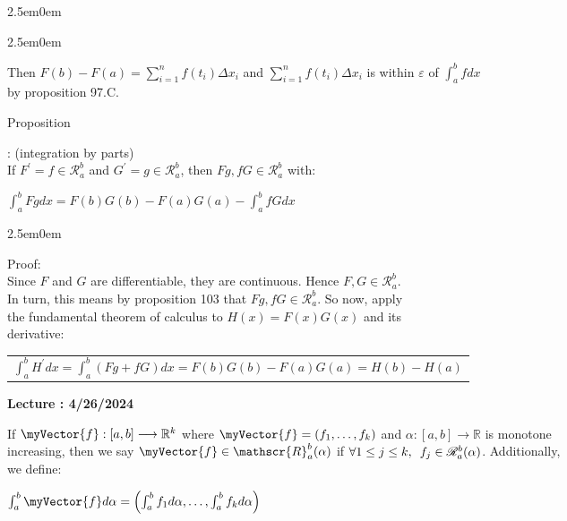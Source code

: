 \documentclass{book}
\newcommand{\hThree}{%
   \color{PineGreen!85!Orange}
   \fontsize{13}{15}\selectfont%
}
\newenvironment{myIndent}{%
   \begin{adjustwidth}{2.5em}{0em}%
}{%
   \end{adjustwidth}%
}
\newcommand{\myHS}{ \hspace{0.5em}}
\newcounter{PropNumber}
\newcommand{\propCount}[1][1]{%
   \addtocounter{PropNumber}{#1}%
   \thePropNumber%
}
\newcommand{\retTwo}{\hfill\bigbreak}
\newcounter{LectureNumber}
\newcommand*{\markLecture}[1]{%
   \stepcounter{LectureNumber}%
   {\huge \color{Black} \textbf{Lecture \theLectureNumber: #1} \newline}%
}
\newcommand{\mVec}[1]{\myVector{#1}}
\begin{document}
{\begin{myIndent}
{\begin{myIndent}
      Then $F(b) - F(a) = \sum\limits_{i=1}^n f(t_i)\Delta x_i$ and $\sum\limits_{i=1}^n f(t_i)\Delta x_i$ is within $\varepsilon$ of $\int_a^bfdx$\\ [-6pt] by proposition 97.C.\retTwo\retTwo
   \end{myIndent}}

   Proposition \propCount: (integration by parts)\\
   If $F^\prime = f \in \mathscr{R}_a^b$ and $G^\prime = g \in \mathscr{R}_a^b$, then $Fg, fG \in \mathscr{R}_a^b$ with:
   
   {\centering $ \int_a^b Fgdx = F(b)G(b) - F(a)G(a) - \int_a^b fGdx $ \retTwo\par}
   
   {\begin{myIndent}\hThree
      Proof:\\
      Since $F$ and $G$ are differentiable, they are continuous. Hence $F, G \in \mathscr{R}_a^b$.\\ In turn, this means by proposition 103 that $Fg, fG \in \mathscr{R}_a^b$. So now, apply\\ the fundamental theorem of calculus to $H(x) = F(x)G(x)$ and its\\ derivative:
      
      \begin{center}{\fontsize{12.5}{14.5}\selectfont
         \begin{tabular}{c}
            $\int_a^b H^\prime dx = \int_a^b (Fg + fG)dx = F(b)G(b) - F(a)G(a) = H(b) - H(a)$
         \end{tabular}}
      \end{center}
   \end{myIndent}}
\end{myIndent}}

\newpage

\markLecture{4/26/2024}

If $\mVec{f}: [a, b] \longrightarrow \mathbb{R}^k$ where $\mVec{f} = \left(f_1, \ldots, f_k\right)$ and $\alpha: [a,b] \longrightarrow \mathbb{R}$ is monotone\\ [-2pt] increasing, then we say $\mVec{f} \in \mathscr{R}_a^b(\alpha)$ if $\forall 1 \leq j \leq k, \myHS f_j \in \mathscr{R}_a^b(\alpha)$. Additionally,\\ we define:

{\centering $\int_a^b \mVec{f}d\alpha = \left(\int_a^b f_1d\alpha, \ldots, \int_a^b f_kd\alpha\right)$ \retTwo\par}
\end{document}
